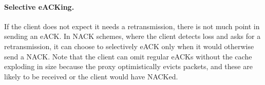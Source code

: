 
\paragraph{Selective eACKing.} If the client does not expect it needs a
 retransmission, there is not much point in sending an eACK. In NACK schemes,
 where the client detects loss and asks for a retransmission, it can choose to
 selectively eACK only when it would otherwise send a NACK. Note that the client can omit
 regular eACKs without the cache exploding in size because the proxy
 optimistically evicts packets, and these are likely to be received or the
 client would have NACKed.\\
